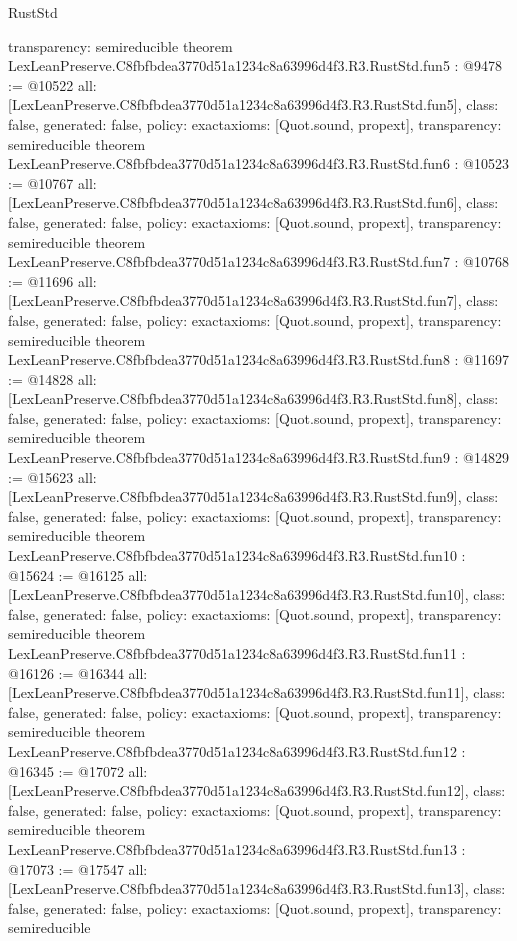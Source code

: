 \begin{lexlean}{RustStd}
\begin{coremodule}
{  transparency: semireducible
}
theorem LexLeanPreserve.C8fbfbdea3770d51a1234c8a63996d4f3.R3.RustStd.fun5 : @9478 := @10522 {
  all: [LexLeanPreserve.C8fbfbdea3770d51a1234c8a63996d4f3.R3.RustStd.fun5],
  class: false,
  generated: false,
  policy: exact{axioms: [Quot.sound, propext]},
  transparency: semireducible
}
theorem LexLeanPreserve.C8fbfbdea3770d51a1234c8a63996d4f3.R3.RustStd.fun6 : @10523 := @10767 {
  all: [LexLeanPreserve.C8fbfbdea3770d51a1234c8a63996d4f3.R3.RustStd.fun6],
  class: false,
  generated: false,
  policy: exact{axioms: [Quot.sound, propext]},
  transparency: semireducible
}
theorem LexLeanPreserve.C8fbfbdea3770d51a1234c8a63996d4f3.R3.RustStd.fun7 : @10768 := @11696 {
  all: [LexLeanPreserve.C8fbfbdea3770d51a1234c8a63996d4f3.R3.RustStd.fun7],
  class: false,
  generated: false,
  policy: exact{axioms: [Quot.sound, propext]},
  transparency: semireducible
}
theorem LexLeanPreserve.C8fbfbdea3770d51a1234c8a63996d4f3.R3.RustStd.fun8 : @11697 := @14828 {
  all: [LexLeanPreserve.C8fbfbdea3770d51a1234c8a63996d4f3.R3.RustStd.fun8],
  class: false,
  generated: false,
  policy: exact{axioms: [Quot.sound, propext]},
  transparency: semireducible
}
theorem LexLeanPreserve.C8fbfbdea3770d51a1234c8a63996d4f3.R3.RustStd.fun9 : @14829 := @15623 {
  all: [LexLeanPreserve.C8fbfbdea3770d51a1234c8a63996d4f3.R3.RustStd.fun9],
  class: false,
  generated: false,
  policy: exact{axioms: [Quot.sound, propext]},
  transparency: semireducible
}
theorem LexLeanPreserve.C8fbfbdea3770d51a1234c8a63996d4f3.R3.RustStd.fun10 : @15624 := @16125 {
  all: [LexLeanPreserve.C8fbfbdea3770d51a1234c8a63996d4f3.R3.RustStd.fun10],
  class: false,
  generated: false,
  policy: exact{axioms: [Quot.sound, propext]},
  transparency: semireducible
}
theorem LexLeanPreserve.C8fbfbdea3770d51a1234c8a63996d4f3.R3.RustStd.fun11 : @16126 := @16344 {
  all: [LexLeanPreserve.C8fbfbdea3770d51a1234c8a63996d4f3.R3.RustStd.fun11],
  class: false,
  generated: false,
  policy: exact{axioms: [Quot.sound, propext]},
  transparency: semireducible
}
theorem LexLeanPreserve.C8fbfbdea3770d51a1234c8a63996d4f3.R3.RustStd.fun12 : @16345 := @17072 {
  all: [LexLeanPreserve.C8fbfbdea3770d51a1234c8a63996d4f3.R3.RustStd.fun12],
  class: false,
  generated: false,
  policy: exact{axioms: [Quot.sound, propext]},
  transparency: semireducible
}
theorem LexLeanPreserve.C8fbfbdea3770d51a1234c8a63996d4f3.R3.RustStd.fun13 : @17073 := @17547 {
  all: [LexLeanPreserve.C8fbfbdea3770d51a1234c8a63996d4f3.R3.RustStd.fun13],
  class: false,
  generated: false,
  policy: exact{axioms: [Quot.sound, propext]},
  transparency: semireducible
}
\end{coremodule}
\end{lexlean}
